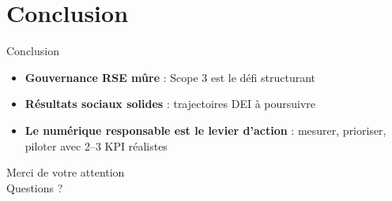 \documentclass[aspectratio=169,french,12pt]{beamer}
\begin{document}
\section{Conclusion}

\begin{frame}{Conclusion}
\begin{itemize}
  \item \textbf{Gouvernance RSE mûre} : Scope 3 est le défi structurant
  \item \textbf{Résultats sociaux solides} : trajectoires DEI à poursuivre
  \item \textbf{Le numérique responsable est le levier d'action} : mesurer, prioriser, piloter avec 2--3 KPI réalistes
\end{itemize}
\vfill
\begin{center}
  \Large Merci de votre attention\\[0.3cm]
  \large Questions ?
\end{center}
\end{frame}
\end{document}
